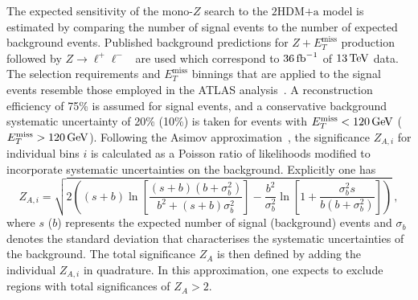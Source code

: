 \documentclass[a4paper, 11pt,notoc]{article}
\newcommand{\MET}{\ensuremath{E_T^\mathrm{miss}}\xspace}
\newcommand{\hdma}{\ensuremath{\textrm{2HDM+a}}\xspace}
\begin{document}
 The expected sensitivity of the mono-$Z$ search to the \hdma model is estimated by comparing the number of  signal events to the number of expected background events. Published background predictions for $Z+\MET$ production followed by $Z \to \ell^+ \ell^-$~\cite{Aaboud:2017bja} are used which correspond to $36 \, {\rm fb}^{-1}$ of $13 \, {\rm TeV}$ data. The selection requirements and \MET binnings that are applied to the signal events resemble those employed in the ATLAS analysis~\cite{Aaboud:2017bja}. A reconstruction efficiency of 75\% is assumed for signal events,  and a conservative background systematic uncertainty of 20\% (10\%) is taken for events with $\MET < 120  \, {\rm GeV}$ ($\MET > 120  \, {\rm GeV}$). Following the Asimov approximation~\cite{Cowan:2010js}, the significance $Z_{A,i}$ for individual bins $i$ is calculated as a Poisson ratio of likelihoods modified to incorporate systematic uncertainties on the background. Explicitly one has \cite{Cowan:2012}
\begin{equation}
\label{eq:significance_wsyst}
Z_{A, i} = \sqrt{ 2 \left ( \left ( s + b \right ) \ln \left [ \frac{\left (s+b \right ) \left (b + \sigma_b^2 \right )}{b^2 + \left ( s +b \right ) \sigma_b^2 } \right ]  - \frac{b^2}{\sigma_b^2} \ln \left [ 1 + \frac{\sigma_b^2 s}{b \left ( b + \sigma_b^2 \right )} \right ] \right ) } \,, 
\end{equation}
where $s$ ($b$) represents the expected number of signal (background) events and $\sigma_b$ denotes the standard deviation that characterises the systematic uncertainties of the background. The total significance $Z_A$ is then defined by adding the individual $Z_{A, i}$ in quadrature.   In this approximation, one expects to exclude regions with total significances of $Z_A > 2$. %
\end{document}
